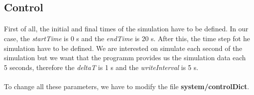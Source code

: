 \subsection{Control}
\paragraph{}
First of all, the initial and final times of the simulation have to be defined. In our case, the \textit{startTime} is 0 s and the \textit{endTime} is 20 s. After this, the time step fot he simulation have to be defined. We are interested on simulate each second of the simulation but we want that the programm provides us the simulation data each 5 seconds, therefore the \textit{deltaT} is 1 s and the \textit{writeInterval} is 5 s.

\paragraph{}
To change all these parameters, we have to modify the file \textbf{system/controlDict}.


